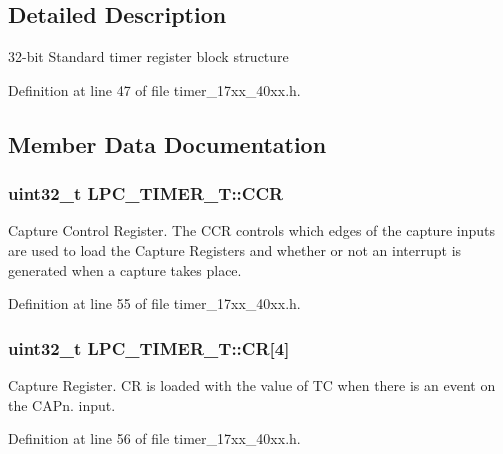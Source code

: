 \subsection{Detailed Description}
32-\/bit Standard timer register block structure 

Definition at line 47 of file timer\+\_\+17xx\+\_\+40xx.\+h.



\subsection{Member Data Documentation}
\subsubsection[{\texorpdfstring{C\+CR}{CCR}}]{ uint32\+\_\+t L\+P\+C\+\_\+\+T\+I\+M\+E\+R\+\_\+\+T\+::\+C\+CR}\hypertarget{structLPC__TIMER__T_ae97a68e845ea92e8c617bbdf1d867e48}{}\label{structLPC__TIMER__T_ae97a68e845ea92e8c617bbdf1d867e48}
Capture Control Register. The C\+CR controls which edges of the capture inputs are used to load the Capture Registers and whether or not an interrupt is generated when a capture takes place. 

Definition at line 55 of file timer\+\_\+17xx\+\_\+40xx.\+h.

\subsubsection[{\texorpdfstring{CR}{CR}}]{ uint32\+\_\+t L\+P\+C\+\_\+\+T\+I\+M\+E\+R\+\_\+\+T\+::\+CR\mbox{[}4\mbox{]}}\hypertarget{structLPC__TIMER__T_aa352dc65884c0a7b8888736a90a4bb7b}{}\label{structLPC__TIMER__T_aa352dc65884c0a7b8888736a90a4bb7b}
Capture Register. CR is loaded with the value of TC when there is an event on the C\+A\+Pn. input. 

Definition at line 56 of file timer\+\_\+17xx\+\_\+40xx.\+h.

